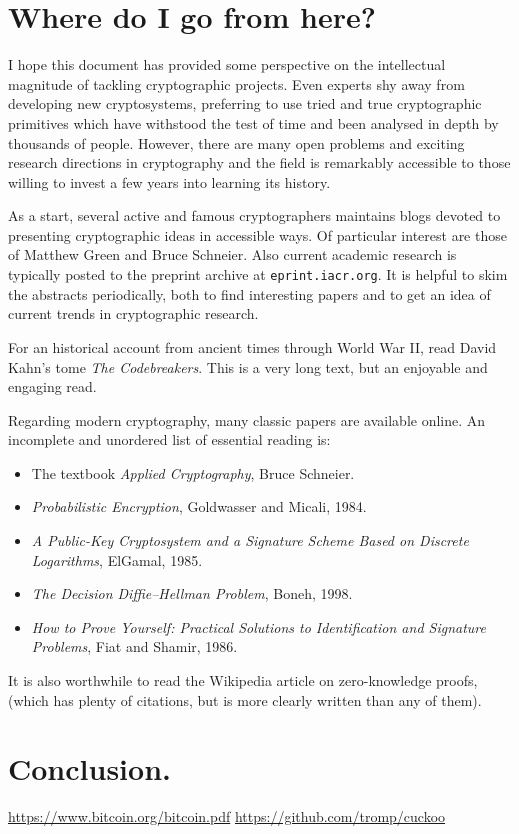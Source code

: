 \documentclass[letterpaper]{article}
\begin{document}
\section{Where do I go from here?}

I hope this document has provided some perspective on the intellectual
magnitude of tackling cryptographic projects. Even experts shy away from
developing new cryptosystems, preferring to use tried and true cryptographic
primitives which have withstood the test of time and been analysed in depth
by thousands of people. However, there are many open problems and exciting
research directions in cryptography and the field is remarkably accessible
to those willing to invest a few years into learning its history.

As a start, several active and famous cryptographers maintains blogs devoted
to presenting cryptographic ideas in accessible ways. Of particular interest
are those of Matthew Green and Bruce Schneier. Also current academic research
is typically posted to the preprint archive at \texttt{eprint.iacr.org}. It
is helpful to skim the abstracts periodically, both to find interesting papers
and to get an idea of current trends in cryptographic research.

For an historical account from ancient times through World War II, read
David Kahn's tome \emph{The Codebreakers}. This is a very long text, but an
enjoyable and engaging read.

Regarding modern cryptography, many classic papers are available online. An
incomplete and unordered list of essential reading is:
\begin{itemize}
\item The textbook \emph{Applied Cryptography}, Bruce Schneier.
\item \emph{Probabilistic Encryption}, Goldwasser and Micali, 1984.
\item \emph{A Public-Key Cryptosystem and a Signature Scheme Based on Discrete Logarithms}, ElGamal, 1985.
\item \emph{The Decision Diffie–Hellman Problem}, Boneh, 1998.
\item \emph{How to Prove Yourself: Practical Solutions to Identification and Signature Problems}, Fiat and Shamir, 1986.
\end{itemize}
It is also worthwhile to read the Wikipedia article on zero-knowledge proofs,
(which has plenty of citations, but is more clearly written than any of them).

\section{Conclusion.}

\begin{thebibliography}{9}
 \url{https://www.bitcoin.org/bitcoin.pdf}
 \url{https://github.com/tromp/cuckoo}
\end{thebibliography}
\end{document}
